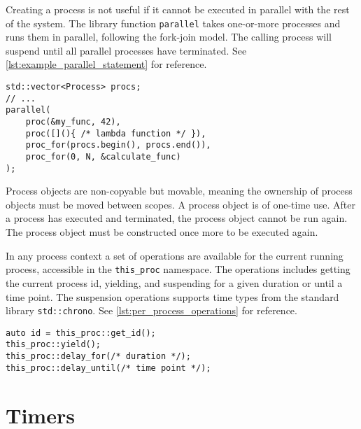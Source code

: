 Creating a process is not useful if it cannot be executed in parallel with the rest of the system. The library function \lstinline[style={CustomC++}]|parallel| takes one\hyp{}or\hyp{}more processes and runs them in parallel, following the fork\hyp{}join model. The calling process will suspend until all parallel processes have terminated. See \cref{lst:example_parallel_statement} for reference.

\begin{lstfloat}
\begin{lstlisting}[caption={Example of the parallel statement.}, label={lst:example_parallel_statement}, style={CustomC++}, xleftmargin={2em}]
std::vector<Process> procs;
// ...
parallel(
    proc(&my_func, 42),
    proc([](){ /* lambda function */ }),
    proc_for(procs.begin(), procs.end()),
    proc_for(0, N, &calculate_func)
);
\end{lstlisting}
\end{lstfloat}

Process objects are non\hyp{}copyable but movable, meaning the ownership of process objects must be moved between scopes. A process object is of one\hyp{}time use. After a process has executed and terminated, the process object cannot be run again. The process object must be constructed once more to be executed again. 

In any process context a set of operations are available for the current running process, accessible in the \lstinline[style={CustomC++}]|this_proc| namespace. The operations includes getting the current process id, yielding, and suspending for a given duration or until a time point. The suspension operations supports time types from the standard library \lstinline[style={CustomC++}]|std::chrono|. See \cref{lst:per_process_operations} for reference.

\begin{lstfloat}
\begin{lstlisting}[caption={Per process operations for the current executing process.}, label={lst:per_process_operations}, style={CustomC++}, xleftmargin={2em}]
auto id = this_proc::get_id();
this_proc::yield();
this_proc::delay_for(/* duration */);
this_proc::delay_until(/* time point */);
\end{lstlisting}
\end{lstfloat}


\section{Timers}
\label{sec:timer_example}



